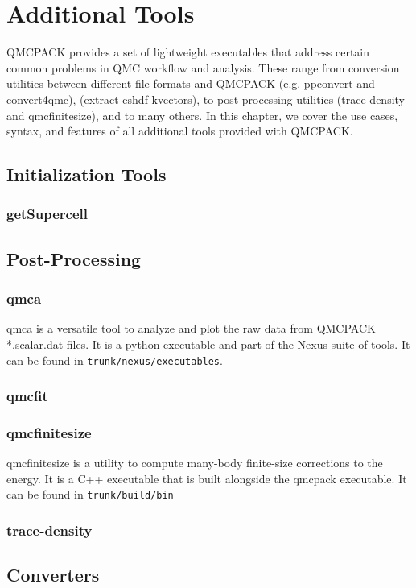 \chapter{Additional Tools}
\label{chap:additional_tools}
QMCPACK provides a set of lightweight executables that address certain
common problems in QMC workflow and analysis.  These range from conversion utilities between 
different file formats and QMCPACK (e.g. ppconvert and convert4qmc),  
(extract-eshdf-kvectors), to post-processing utilities (trace-density and qmcfinitesize), and to many others.  In this chapter, we cover the use cases, syntax, and features of all additional tools provided with QMCPACK.  

\section{Initialization Tools}
  \subsection{getSupercell}

\section{Post-Processing}
  \subsection{qmca}
    qmca is a versatile tool to analyze and plot the raw data from QMCPACK *.scalar.dat files.
    It is a python executable and part of the Nexus suite of tools.  It can be found in 
    \texttt{trunk/nexus/executables}. 
  \subsection{qmcfit}
  \subsection{qmcfinitesize}
    qmcfinitesize is a utility to compute many-body finite-size corrections to the energy.  It
    is a C++ executable that is built alongside the qmcpack executable.  It can be found in 
    \texttt{trunk/build/bin}
  \subsection{trace-density}

\section{Converters} 
    
